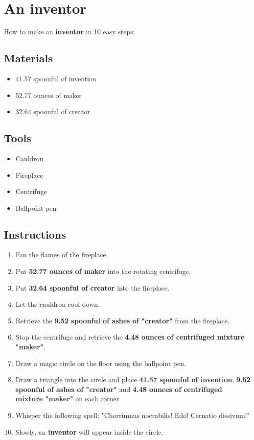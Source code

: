 \documentclass{article}
\begin{document}
\section{An inventor}How to make an \textbf{inventor} in 10 easy steps:

\subsection{Materials}\begin{itemize}
\item 
41.57 spoonful of invention
\item 
52.77 ounces of maker
\item 
32.64 spoonful of creator
\end{itemize}
\subsection{Tools}\begin{itemize}
\item 
Cauldron
\item 
Fireplace
\item 
Centrifuge
\item 
Ballpoint pen
\end{itemize}
\subsection{Instructions}\begin{enumerate}
\item 
Fan the flames of the fireplace.
\item 
Put \textbf{52.77 ounces of maker} into the rotating centrifuge.
\item 
Put \textbf{32.64 spoonful of creator} into the fireplace.
\item 
Let the cauldron cool down.
\item 
Retrieve the \textbf{9.52 spoonful of ashes of "creator"} from the fireplace.
\item 
Stop the centrifuge and retrieve the \textbf{4.48 ounces of centrifuged mixture "maker"}.
\item 
Draw a magic circle on the floor using the ballpoint pen.
\item 
Draw a triangle into the circle and place \textbf{41.57 spoonful of invention}, \textbf{9.52 spoonful of ashes of "creator"} and \textbf{4.48 ounces of centrifuged mixture "maker"} on each corner.
\item 
Whisper the following spell: "Chorrimnus nocrabilis! Edo! Cernatio dissivum!"
\item 
Slowly, an \textbf{inventor} will appear inside the circle.
\end{enumerate}
\newpage
\end{document}
